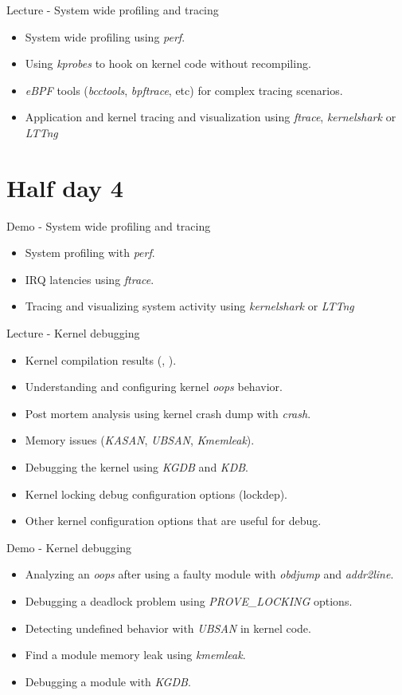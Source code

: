 \documentclass[a4paper,12pt,obeyspaces,spaces,hyphens]{article}
\begin{document}
\feagendaonecolumn
{Lecture - System wide profiling and tracing}
{
  \begin{itemize}
  \item System wide profiling using {\em perf}.
  \item Using {\em kprobes} to hook on kernel code without
    recompiling.
  \item {\em eBPF} tools ({\em bcctools}, {\em bpftrace}, etc) for
    complex tracing scenarios.
  \item Application and kernel tracing and visualization using {\em
      ftrace}, {\em kernelshark} or {\em LTTng}
  \end{itemize}
}

\section{Half day 4}

\feagendaonecolumn
{Demo - System wide profiling and tracing}
{
  \begin{itemize}
  \item System profiling with {\em perf}.
  \item IRQ latencies using {\em ftrace}.
  \item Tracing and visualizing system activity using {\em
      kernelshark} or {\em LTTng}
  \end{itemize}
}

\feagendatwocolumn
{Lecture - Kernel debugging}
{
  \begin{itemize}
  \item Kernel compilation results (, ).
  \item Understanding and configuring kernel {\em oops} behavior.
  \item Post mortem analysis using kernel crash dump with {\em crash}.
  \item Memory issues ({\em KASAN}, {\em UBSAN}, {\em Kmemleak}).
  \item Debugging the kernel using {\em KGDB} and {\em KDB}.
  \item Kernel locking debug configuration options (lockdep).
  \item Other kernel configuration options that are useful for debug.
  \end{itemize}
}
{Demo - Kernel debugging}
{
  \begin{itemize}
  \item Analyzing an {\em oops} after using a faulty module with
    {\em obdjump} and {\em addr2line}.
  \item Debugging a deadlock problem using {\em PROVE\_LOCKING} options.
  \item Detecting undefined behavior with {\em UBSAN} in kernel code.
  \item Find a module memory leak using {\em kmemleak}.
  \item Debugging a module with {\em KGDB}.
  \end{itemize}
}
\end{document}
